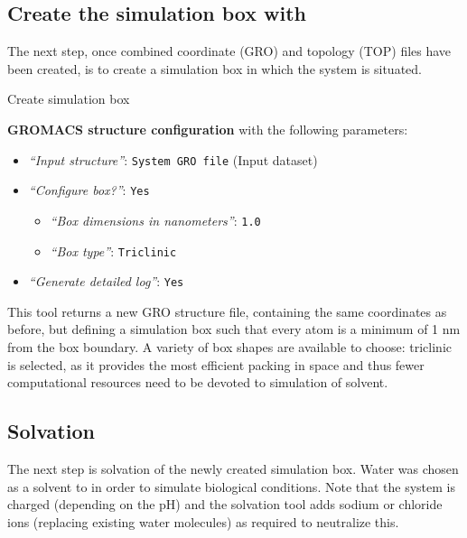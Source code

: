 \documentclass[twocolumn]{bmcart}%
\providecommand{\tightlist}{%
  \setlength{\itemsep}{0pt}\setlength{\parskip}{0pt}}
\begin{document}
\subsection*{\texorpdfstring{Create the simulation box with
}{Create the simulation box}}\label{create-the-simulation-box-with-gromacs-structure-configuration}

The next step, once combined coordinate (GRO) and topology (TOP) files
have been created, is to create a simulation box in which the system is
situated.

\begin{handson_box_colour}{Create simulation box}


  \textbf{GROMACS structure configuration} with the following
  parameters:

  \begin{itemize}
  \item
    \emph{``Input structure''}: \texttt{System\ GRO\ file} (Input
    dataset)
  \item
    \emph{``Configure box?''}: \texttt{Yes}

    \begin{itemize}
    \item
      \emph{``Box dimensions in nanometers''}: \texttt{1.0}
    \item
      \emph{``Box type''}: \texttt{Triclinic}
    \end{itemize}
  \item
    \emph{``Generate detailed log''}: \texttt{Yes}
  \end{itemize}

\end{handson_box_colour}

This tool returns a new GRO structure file, containing the same coordinates as before, but defining a simulation box such that every atom is a minimum of 1 nm from the box boundary. A variety of box shapes are available to choose: triclinic is selected, as it provides the most efficient packing in space and thus fewer computational resources need to be devoted to simulation of solvent. 

\subsection*{Solvation}\label{solvation}
The next step is solvation of the newly created simulation box. Water was chosen as a solvent to in order to simulate biological conditions. Note
that the system is charged (depending on the pH) and the solvation tool
 adds sodium or chloride ions (replacing existing water molecules) as required to neutralize this.
\end{document}
